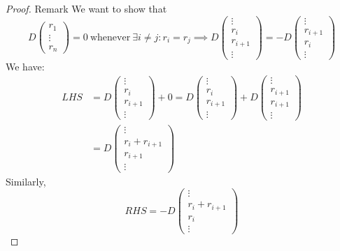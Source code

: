 \begin{proof} {Remark}
    \pffwd We want to show that \[
        D\begin{pmatrix}
                r_1 \\ \vdots \\ r_n
            \end{pmatrix} = 0 \:\text{whenever}\: \exists i \neq j: r_i = r_j \implies D \begin{pmatrix}
                \vdots \\ r_i \\ r_{i+1} \\ \vdots
            \end{pmatrix} = -D \begin{pmatrix}
                \vdots \\ r_{i+1} \\ r_i \\ \vdots
            \end{pmatrix}
    \]
    We have:
    \begin{align*}
        LHS &= D \begin{pmatrix}
            \vdots \\ r_i \\ r_{i+1} \\ \vdots
        \end{pmatrix} + 0
        = D \begin{pmatrix}
            \vdots \\ r_i \\ r_{i+1} \\ \vdots
        \end{pmatrix} + D \begin{pmatrix}
            \vdots \\ r_{i+1} \\ r_{i+1} \\ \vdots
        \end{pmatrix} \\
        &= D \begin{pmatrix}
            \vdots \\ r_i + r_{i+1} \\ r_{i+1} \\ \vdots
        \end{pmatrix}
    \end{align*}
    Similarly, \[
    RHS = -D \begin{pmatrix}
        \vdots \\ r_i + r_{i+1} \\ r_i \\ \vdots
    \end{pmatrix}
    \]


\end{proof}
